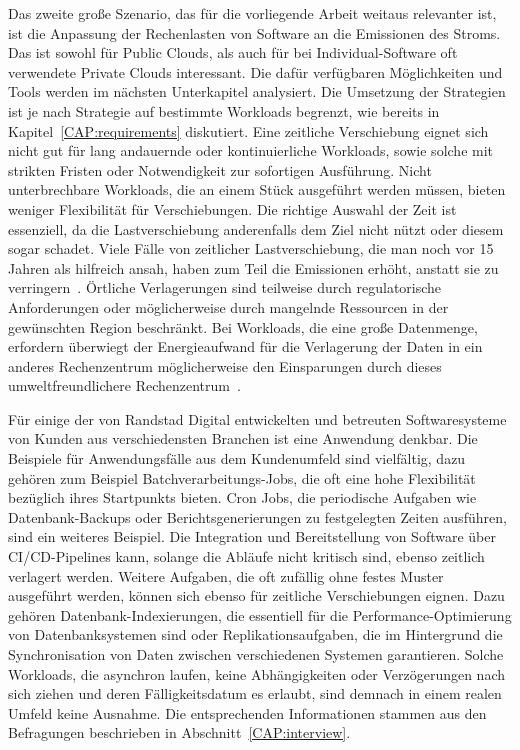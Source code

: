 Das zweite große Szenario, das für die vorliegende Arbeit weitaus relevanter ist, ist die Anpassung der Rechenlasten von Software an die Emissionen des Stroms.
Das ist sowohl für Public Clouds, als auch für bei Individual-Software oft verwendete Private Clouds interessant.
Die dafür verfügbaren Möglichkeiten und Tools werden im nächsten Unterkapitel analysiert.
Die Umsetzung der Strategien ist je nach Strategie auf bestimmte Workloads begrenzt, wie bereits in Kapitel~\ref{CAP:requirements} diskutiert.
Eine zeitliche Verschiebung eignet sich nicht gut für lang andauernde oder kontinuierliche Workloads, sowie solche mit strikten Fristen oder Notwendigkeit zur sofortigen Ausführung.
Nicht unterbrechbare Workloads, die an einem Stück ausgeführt werden müssen, bieten weniger Flexibilität für Verschiebungen.
Die richtige Auswahl der Zeit ist essenziell, da die Lastverschiebung anderenfalls dem Ziel nicht nützt oder diesem sogar schadet.
Viele Fälle von zeitlicher Lastverschiebung, die man noch vor 15 Jahren als hilfreich ansah, haben zum Teil die Emissionen erhöht, anstatt sie zu verringern~\cite{WattTime.12.3.2024}.
Örtliche Verlagerungen sind teilweise durch regulatorische Anforderungen oder möglicherweise durch mangelnde Ressourcen in der gewünschten Region beschränkt.
Bei Workloads, die eine große Datenmenge, erfordern überwiegt der Energieaufwand für die Verlagerung der Daten in ein anderes Rechenzentrum möglicherweise den Einsparungen durch dieses umweltfreundlichere Rechenzentrum~\cite{Norlander.2023}.

Für einige der von Randstad Digital entwickelten und betreuten Softwaresysteme von Kunden aus verschiedensten Branchen ist eine Anwendung denkbar.
Die Beispiele für Anwendungsfälle aus dem Kundenumfeld sind vielfältig, dazu gehören zum Beispiel Batchverarbeitungs-Jobs, die oft eine hohe Flexibilität bezüglich ihres Startpunkts bieten.
Cron Jobs, die periodische Aufgaben wie Datenbank-Backups oder Berichtsgenerierungen zu festgelegten Zeiten ausführen, sind ein weiteres Beispiel.
Die Integration und Bereitstellung von Software über CI/CD-Pipelines kann, solange die Abläufe nicht kritisch sind, ebenso zeitlich verlagert werden.
Weitere Aufgaben, die oft zufällig ohne festes Muster ausgeführt werden, können sich ebenso für zeitliche Verschiebungen eignen.
Dazu gehören Datenbank-Indexierungen, die essentiell für die Performance-Optimierung von Datenbanksystemen sind oder Replikationsaufgaben, die im Hintergrund die Synchronisation von Daten zwischen verschiedenen Systemen garantieren.
Solche Workloads, die asynchron laufen, keine Abhängigkeiten oder Verzögerungen nach sich ziehen und deren Fälligkeitsdatum es erlaubt, sind demnach in einem realen Umfeld keine Ausnahme.
Die entsprechenden Informationen stammen aus den Befragungen beschrieben in Abschnitt~\ref{CAP:interview}.

